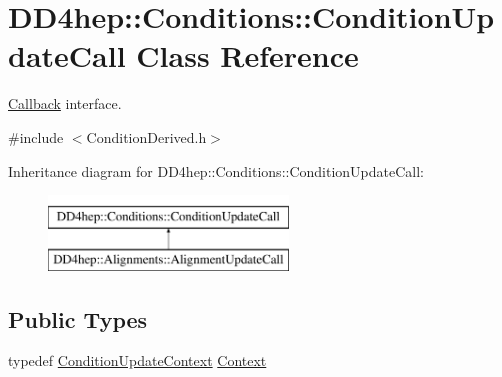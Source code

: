 \hypertarget{class_d_d4hep_1_1_conditions_1_1_condition_update_call}{}\section{D\+D4hep\+:\+:Conditions\+:\+:Condition\+Update\+Call Class Reference}
\label{class_d_d4hep_1_1_conditions_1_1_condition_update_call}


\hyperlink{class_d_d4hep_1_1_callback}{Callback} interface.  




{\ttfamily \#include $<$Condition\+Derived.\+h$>$}

Inheritance diagram for D\+D4hep\+:\+:Conditions\+:\+:Condition\+Update\+Call\+:\begin{figure}[H]
\begin{center}
\leavevmode
\includegraphics[height=2.000000cm]{class_d_d4hep_1_1_conditions_1_1_condition_update_call}
\end{center}
\end{figure}
\subsection*{Public Types}
\begin{DoxyCompactItemize}
\item 
typedef \hyperlink{class_d_d4hep_1_1_conditions_1_1_condition_update_context}{Condition\+Update\+Context} \hyperlink{class_d_d4hep_1_1_conditions_1_1_condition_update_call_a96b8a912f3a2ea17f139a5f5dcac7146}{Context}
\end{DoxyCompactItemize}
